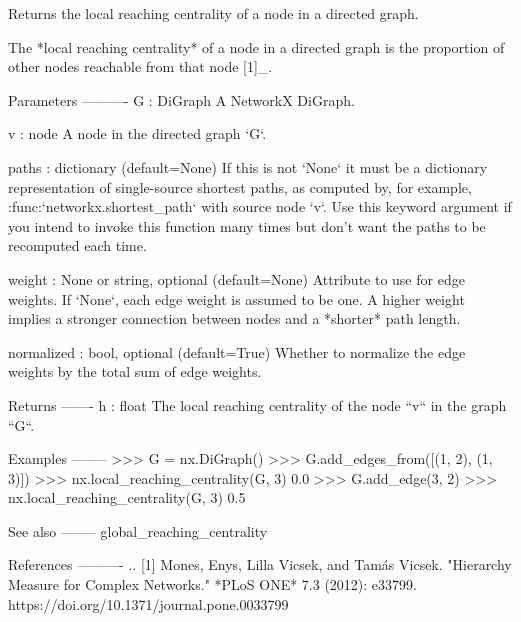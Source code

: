 \begin{DoxyVerb}Returns the local reaching centrality of a node in a directed
graph.

The *local reaching centrality* of a node in a directed graph is the
proportion of other nodes reachable from that node [1]_.

Parameters
----------
G : DiGraph
    A NetworkX DiGraph.

v : node
    A node in the directed graph `G`.

paths : dictionary (default=None)
    If this is not `None` it must be a dictionary representation
    of single-source shortest paths, as computed by, for example,
    :func:`networkx.shortest_path` with source node `v`. Use this
    keyword argument if you intend to invoke this function many
    times but don't want the paths to be recomputed each time.

weight : None or string, optional (default=None)
    Attribute to use for edge weights.  If `None`, each edge weight
    is assumed to be one. A higher weight implies a stronger
    connection between nodes and a *shorter* path length.

normalized : bool, optional (default=True)
    Whether to normalize the edge weights by the total sum of edge
    weights.

Returns
-------
h : float
    The local reaching centrality of the node ``v`` in the graph
    ``G``.

Examples
--------
>>> G = nx.DiGraph()
>>> G.add_edges_from([(1, 2), (1, 3)])
>>> nx.local_reaching_centrality(G, 3)
0.0
>>> G.add_edge(3, 2)
>>> nx.local_reaching_centrality(G, 3)
0.5

See also
--------
global_reaching_centrality

References
----------
.. [1] Mones, Enys, Lilla Vicsek, and Tamás Vicsek.
       "Hierarchy Measure for Complex Networks."
       *PLoS ONE* 7.3 (2012): e33799.
       https://doi.org/10.1371/journal.pone.0033799
\end{DoxyVerb}
 